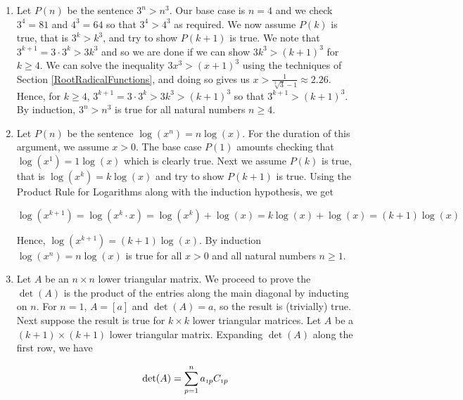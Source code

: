 \documentclass{ximera}
\begin{document}
\begin{enumerate}
\addtocounter{enumi}{2}

\item Let $P(n)$  be the sentence $3^n > n^3$.  Our base case is $n=4$ and we check $3^4 = 81$ and $4^3 = 64$ so that $3^4 > 4^3$ as required.  We now assume $P(k)$ is true, that is $3^k > k^3$, and try to show $P(k+1)$ is true.  We note that $3^{k+1} = 3 \cdot 3^{k} > 3k^3$ and so we are done if we can show $3k^3 > (k+1)^3$ for $k \geq 4$. We can solve the inequality $3x^3 > (x+1)^3$ using the techniques of Section \ref{RootRadicalFunctions}, and doing so gives us $x > \frac{1}{\sqrt[3]{3}-1} \approx 2.26.$  Hence, for $k \geq 4$, $3^{k+1} = 3 \cdot 3^{k} > 3k^3 > (k+1)^3$ so that $3^{k+1} > (k+1)^3$.   By induction, $3^n > n^3$ is true for all natural numbers $n \geq 4$.

\addtocounter{enumi}{1}

\item  Let $P(n)$ be the sentence $\log\left(x^n \right) = n \log(x)$.  For the duration of this argument, we assume $x > 0$. The base case $P(1)$ amounts checking that $\log\left(x^1\right) = 1 \log(x)$ which is clearly true.  Next we assume $P(k)$ is true, that is $\log\left(x^{k}\right) = k \log(x)$ and try to show $P(k+1)$ is true.  Using the Product Rule for Logarithms along with the induction hypothesis, we get

 \[\log\left(x^{k+1}\right) = \log\left(x^{k} \cdot x\right) = \log\left(x^{k}\right) + \log(x) = k \log(x) + \log(x) = (k+1) \log(x) \]
 
 Hence, $\log\left(x^{k+1}\right) = (k+1) \log(x)$.  By induction  $\log\left(x^n \right) = n \log(x)$ is true for all $x>0$ and all natural numbers $n \geq 1$.


\addtocounter{enumi}{2}

\item  Let $A$ be an $n \times n$ lower triangular matrix.  We proceed to prove the $\det(A)$ is the product of the entries along the main diagonal by inducting on $n$.  For $n=1$, $A = [a]$ and $\det(A) = a$, so the result is (trivially) true.  Next suppose the result is true for $k \times k$ lower triangular matrices.  Let $A$ be a $(k+1) \times (k+1)$ lower triangular matrix.  Expanding $\det(A)$ along the first row, we have

\[ \det(A)  = \displaystyle{\sum_{p=1}^{n} a_{\mbox{\tiny$1$}p} C_{\mbox{\tiny$1$}p}} \]


\end{enumerate}
\end{document}

